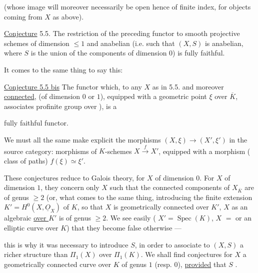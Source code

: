 
(whose image will moreover necessarily be open hence
of finite index, for objects coming from $X$ as above).

\uline{Conjecture} 5.5. The restriction of the preceding functor
to smooth projective schemes of dimension $\leq 1$ and anabelian
(i.e. such that $(X,S)$ is anabelian, where $S$ is the union of the
components of dimension $0$) is fully faithful.


It comes to the same thing to say this:


\uline{Conjecture 5.5 bis} The functor which, to any $X$
 as in 5.5. and moreover \uline{connected},
(of dimension $0$ or $1$), equipped with a geometric point $\xi$ over
$\overline K$, associates  profinite
group  over
), is a



fully faithful functor.

We must all the same make explicit the
morphisms $(X,\xi)\longrightarrow(X',\xi')$ in the source category:
morphisms of $K$-schemes $X\xrightarrow{f}X'$, equipped with a morphism
 ( class of paths)
 $f(\xi)\simeq\xi'$.

These conjectures reduce to Galois theory, for $X$ of
dimension $0$. For $X$ of dimension $1$, they concern only $X$ such
that the connected components of $X_{\overline K}$ are of genus $\geq 2$
(or, what comes to the same thing, introducing
the finite extension $K'=H^0(X,\underline{O}_X)$ of $K$, so that $X$ is
geometrically connected over $K'$,  $X$ as
an algebraic  
\uline{over $K'$} is of genus $\geq 2$. We see easily
( $X'=\operatorname{Spec}(K)$,
$X$  $=$
 or an elliptic curve over $K$)
that they become false otherwise ---



this is why it was necessary to introduce $S$,
in order to associate to $(X,S)$ a richer structure than $\Pi_1(X)$ over
$\Pi_1(K)$. We shall find conjectures 
for $X$  a geometrically connected curve over $K$ of genus
$1$ (resp. $0$),
\uline{provided} that $S$
.

